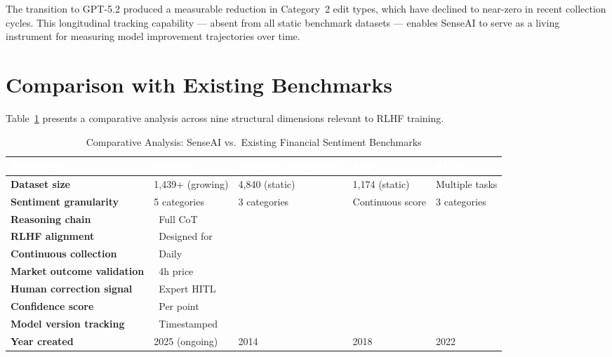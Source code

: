 \documentclass[11pt,a4paper]{article}
\newcommand{\cmark}{\ding{51}}
\newcommand{\xmark}{\ding{55}}
\begin{document}
The transition to GPT-5.2 produced a measurable reduction in Category~2 edit types,
which have declined to near-zero in recent collection cycles. This longitudinal tracking
capability --- absent from all static benchmark datasets --- enables SenseAI to serve as
a living instrument for measuring model improvement trajectories over time.

\section{Comparison with Existing Benchmarks}
\label{sec:comparison}

Table~\ref{tab:benchmark_comparison} presents a comparative analysis across nine
structural dimensions relevant to RLHF training.

\begin{table}[H]
\centering
\caption{Comparative Analysis: SenseAI vs.\ Existing Financial Sentiment Benchmarks}
\label{tab:benchmark_comparison}
\renewcommand{\arraystretch}{1.35}
\small
\begin{tabularx}{\textwidth}{>{\bfseries}p{3.6cm} X X X X}
\toprule
\rowcolor{headerblue}
\textcolor{white}{\textbf{Dimension}} &
\textcolor{white}{\textbf{SenseAI}} &
\textcolor{white}{\textbf{FinancialPhraseBank}} &
\textcolor{white}{\textbf{FiQA}} &
\textcolor{white}{\textbf{FLUE}} \\
\midrule
Dataset size          & 1,439+ (growing)   & 4,840 (static)    & 1,174 (static) & Multiple tasks \\
\rowcolor{rowgray}
Sentiment granularity & 5 categories       & 3 categories      & Continuous score & 3 categories \\
Reasoning chain       & \cmark\ Full CoT   & \xmark            & \xmark         & \xmark \\
\rowcolor{rowgray}
RLHF alignment        & \cmark\ Designed for & \xmark          & \xmark         & \xmark \\
Continuous collection & \cmark\ Daily      & \xmark            & \xmark         & \xmark \\
\rowcolor{rowgray}
Market outcome validation & \cmark\ 4h price & \xmark          & \xmark         & \xmark \\
Human correction signal & \cmark\ Expert HITL & \xmark         & \xmark         & \xmark \\
\rowcolor{rowgray}
Confidence score      & \cmark\ Per point  & \xmark            & \xmark         & \xmark \\
Model version tracking & \cmark\ Timestamped & \xmark          & \xmark         & \xmark \\
\rowcolor{rowgray}
Year created          & 2025 (ongoing)     & 2014              & 2018           & 2022 \\
\bottomrule
\end{tabularx}
\end{table}
\end{document}
